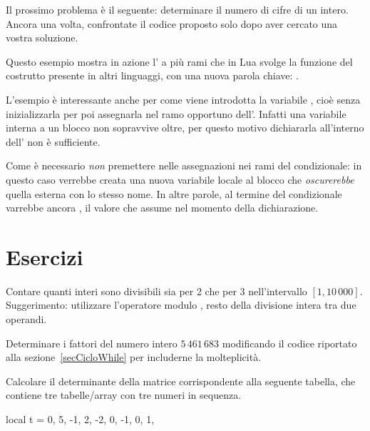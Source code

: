 Il prossimo problema è il seguente: determinare il numero di cifre di un
intero. Ancora una volta, confrontate il codice proposto solo dopo aver cercato
una vostra soluzione.

Questo esempio mostra in azione l' a più rami che in Lua svolge
la funzione del costrutto  presente in altri linguaggi, con una
nuova parola chiave: .

L'esempio è interessante anche per come viene introdotta la variabile
, cioè senza inizializzarla per poi assegnarla nel ramo opportuno
dell'. Infatti una variabile interna a un blocco non sopravvive oltre,
per questo motivo dichiararla all'interno dell' non è sufficiente.

Come è necessario \emph{non} premettere  nelle
assegnazioni nei rami del condizionale: in questo caso verrebbe creata una nuova
variabile locale al blocco che \emph{oscurerebbe} quella esterna con lo stesso
nome. In altre parole, al termine del condizionale  varrebbe ancora
, il valore che assume nel momento della dichiarazione.


\section{Esercizi}

\begin{Exercise}[label=cos-01]
Contare quanti interi sono divisibili sia per 2 che per 3 nell'intervallo \( [1,
10\,000]\). Suggerimento: utilizzare l'operatore modulo \key{\%}, resto della
divisione intera tra due operandi.
\end{Exercise}

\begin{Exercise}[label=cos-02]
Determinare i fattori del numero intero \(5\,461\,683\) modificando il codice
riportato alla sezione~\ref{secCicloWhile} per includerne la molteplicità.
\end{Exercise}

\begin{Exercise}[label=cos-03]
Calcolare il determinante della matrice corrispondente alla seguente tabella,
che contiene tre tabelle/array con tre numeri in sequenza.
\begin{lines}
local t = {
    { 0,  5, -1},
    { 2, -2,  0},
    {-1,  0,  1},
}
\end{lines}
\end{Exercise}

